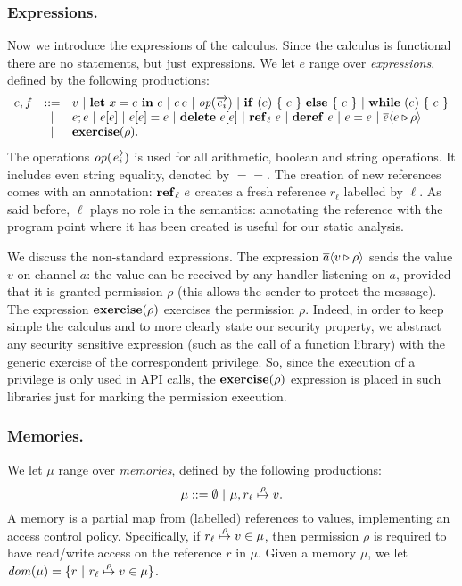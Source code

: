 \subsubsection{Expressions.} 
Now we introduce the expressions of the calculus. Since the calculus is functional there are no statements, but just expressions.
We let $e$ range over \emph{expressions}, defined by the following productions:
\[
\begin{array}{lcl}
e,f & ::= & v ~|~ \mathbf{let}\ x = e\ \mathbf{in}\ e ~|~ e\, e ~|~ \mathit{op}(\overrightarrow{e_i}) ~|~ \mathbf{if}\ (e)\ \{\ e\ \}\ \mathbf{else}\ \{\ e\ \} ~|~ \mathbf{while}\ (e)\ \{\ e\ \} \\
& | & e;e ~|~ e[e] ~|~ e[e] = e ~|~ \mathbf{delete}\ e[e] ~|~ \mathbf{ref}_{\ell}\ e ~|~ \mathbf{deref}\ e ~|~ e = e ~|~ \overline{e} \langle e \triangleright \rho \rangle \\
& | & \mathbf{exercise}(\rho).
\end{array}
\]
The operations $\mathit{op}(\overrightarrow{e_i})$ is used for all arithmetic, boolean and string operations. It includes even string equality, denoted by $==$. The creation of new references comes with an annotation:
$\mathbf{ref}_{\ell}\ e$ creates a fresh reference $r_\ell$ labelled by $\ell$.
As said before, $\ell$ plays no role in the semantics: annotating the reference
with the program point where it has been created is useful for our
static analysis.

We discuss the non-standard expressions. The expression
$\overline{a} \langle v \triangleright \rho \rangle$ sends the value $v$ on channel $a$: the value can
be received by any handler listening on $a$, provided that it is
granted permission $\rho$ (this allows the sender to protect the
message). The expression $\mathbf{exercise}(\rho)$ exercises the permission
$\rho$. Indeed, in order to keep simple the calculus and to more
clearly state our security property, we abstract any
security sensitive expression (such as the call of a function library)
with the generic exercise of the correspondent privilege. So, since the execution of a privilege is only used in API calls, the $\mathbf{exercise}(\rho)$ expression is placed in such libraries just for marking the permission execution.

\subsubsection{Memories.}
We let $\mu$ range over \emph{memories}, defined by the following productions:
\[
\mu ::= \emptyset ~|~ \mu, r_{\ell} \stackrel{\rho}{\mapsto} v.
\]
A memory is a partial map from (labelled) references to values, implementing an access control policy. Specifically, if $r_{\ell} \stackrel{\rho}{\mapsto} v \in \mu$, then permission $\rho$ is required to have read/write access on the reference $r$ in $\mu$. Given a memory $\mu$, we let $\mathit{dom}(\mu) = \{r ~|~ r_{\ell} \stackrel{\rho}{\mapsto} v \in \mu\}$.

